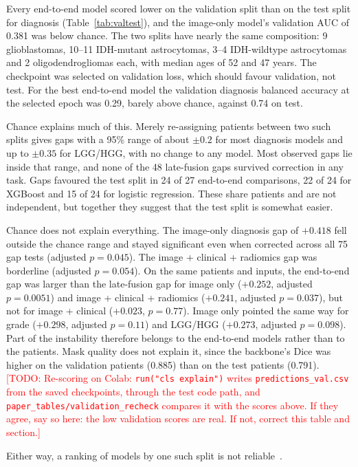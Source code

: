 \documentclass[11pt]{article}
\newcommand{\todo}[1]{\textcolor{red}{[TODO: #1]}}
\begin{document}
Every end-to-end model scored lower on the validation split than on the test split for diagnosis
(Table~\ref{tab:valtest}), and the image-only model's validation AUC of 0.381 was below chance. The two splits have
nearly the same composition: 9 glioblastomas, 10--11 IDH-mutant astrocytomas, 3--4 IDH-wildtype astrocytomas and 2
oligodendrogliomas each, with median ages of 52 and 47 years. The checkpoint was selected on validation loss, which
should favour validation, not test. For the best end-to-end model the validation diagnosis balanced accuracy at the
selected epoch was 0.29, barely above chance, against 0.74 on test.

Chance explains much of this. Merely re-assigning patients between two such splits gives gaps with a 95\% range of
about $\pm 0.2$ for most diagnosis models and up to $\pm 0.35$ for LGG/HGG, with no change to any model. Most observed
gaps lie inside that range, and none of the 48 late-fusion gaps survived correction in any task. Gaps favoured the test
split in 24 of 27 end-to-end comparisons, 22 of 24 for XGBoost and 15 of 24 for logistic regression. These share
patients and are not independent, but together they suggest that the test split is somewhat easier.

Chance does not explain everything. The image-only diagnosis gap of $+0.418$ fell outside the chance range and stayed
significant even when corrected across all 75 gap tests (adjusted $p = 0.045$). The image + clinical + radiomics gap
was borderline (adjusted $p = 0.054$). On the same patients and inputs, the end-to-end gap was larger than the
late-fusion gap for image only ($+0.252$, adjusted $p = 0.0051$) and image + clinical + radiomics ($+0.241$, adjusted
$p = 0.037$), but not for image + clinical ($+0.023$, $p = 0.77$). Image only pointed the same way for grade ($+0.298$,
adjusted $p = 0.11$) and LGG/HGG ($+0.273$, adjusted $p = 0.098$). Part of the instability therefore belongs to the
end-to-end models rather than to the patients. Mask quality does not explain it, since the backbone's Dice was higher on
the validation patients (0.885) than on the test patients (0.791).
\todo{Re-scoring on Colab: \texttt{run("cls explain")} writes \texttt{predictions\_val.csv} from the saved checkpoints,
through the test code path, and \texttt{paper\_tables/validation\_recheck} compares it with the scores above. If they
agree, say so here: the low validation scores are real. If not, correct this table and section.}

Either way, a ranking of models by one such split is not reliable~\cite{varoquaux2018cv}.
\end{document}
